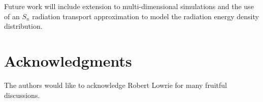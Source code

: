 \documentclass[times,doublespace]{fldauth}%
\begin{document}
%
Future work will include extension to multi-dimensional simulations and the use of an $S_n$ radiation transport approximation to model the radiation energy density distribution.



\section*{Acknowledgments}
The authors would like to acknowledge Robert Lowrie for many fruitful discussions. 

\appendix



\end{document}
